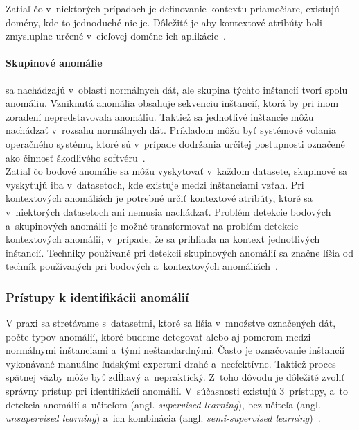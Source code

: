\documentclass[a4paper,twoside,slovak,12pt,appendix]{article}
\begin{document}
Zatiaľ čo v~niektorých prípadoch je definovanie kontextu priamočiare, existujú
domény, kde to jednoduché nie je. Dôležité je aby kontextové atribúty boli
zmysluplne určené v~cieľovej doméne ich aplikácie~\cite{Chandola2009}.

\paragraph{Skupinové anomálie} sa nachádzajú v~oblasti normálnych dát, ale
skupina týchto inštancií tvorí spolu anomáliu. Vzniknutá anomália obsahuje
sekvenciu inštancií, ktorá by pri inom zoradení nepredstavovala anomáliu.
Taktiež sa jednotlivé inštancie môžu nachádzať v~rozsahu normálnych dát.
Príkladom môžu byť systémové volania operačného systému, ktoré sú v~prípade
dodržania určitej postupnosti označené ako činnosť škodlivého
softvéru~\cite{Chandola2009}.\\

Zatiaľ čo bodové anomálie sa môžu vyskytovať v~každom datasete, skupinové sa
vyskytujú iba v~datasetoch, kde existuje medzi inštanciami vzťah. Pri
kontextových anomáliách je potrebné určiť kontextové atribúty, ktoré sa
v~niektorých datasetoch ani nemusia nachádzať. Problém detekcie bodových
a~skupinových anomálií je možné transformovať na problém detekcie kontextových
anomálií, v~prípade, že sa prihliada na kontext jednotlivých inštancií. Techniky
používané pri detekcii skupinových anomálií sa značne líšia od techník
používaných pri bodových a~kontextových anomáliách~\cite{Chandola2009}.


\subsubsection{Prístupy k identifikácii anomálií}
V praxi sa stretávame s~datasetmi, ktoré sa líšia v~množstve označených dát,
počte typov anomálií, ktoré budeme detegovať alebo aj pomerom medzi normálnymi
inštanciami a~tými neštandardnými. Často je označovanie inštancií vykonávané
manuálne ľudskými expertmi drahé a~neefektívne. Taktiež proces spätnej väzby
môže byť zdĺhavý a~nepraktický. Z~toho dôvodu je dôležité zvoliť správny
prístup pri identifikácií anomálií. V~súčasnosti existujú 3~prístupy, a~to
detekcia anomálií s~učiteľom (angl. \textit{supervised learning}), bez učiteľa
(angl. \textit{unsupervised learning}) a~ich kombinácia (angl.
\textit{semi-supervised learning})~\cite{Chandola2009}.
\end{document}
